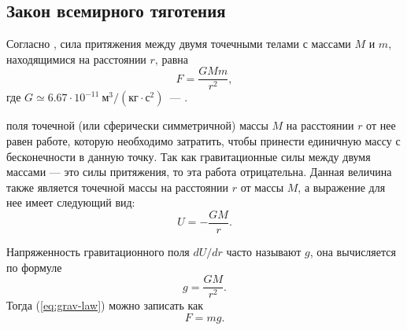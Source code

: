 \subsection{Закон всемирного тяготения}
Согласно , сила притяжения
между двумя точечными телами с массами $M$ и $m$,
находящимися на расстоянии $r$, равна
\begin{equation}
	F=\frac{GMm}{r^2}, \label{eq:grav-law}
\end{equation}\nopagebreak где $G\simeq 6.67\cdot 10^{-11}~\text{м}^3 /
\left( \text{кг} \cdot \text{с}^2 \right)$~---
.

 поля точечной (или сферически
симметричной) массы $M$ на расстоянии $r$ от нее равен
работе, которую необходимо затратить, чтобы принести
единичную массу с бесконечности в данную точку. Так как
гравитационные силы между двумя массами --- это силы
притяжения, то эта работа отрицательна. Данная
величина также является  точечной
массы на расстоянии $r$ от массы $M$, а выражение для нее имеет
следующий вид:
\begin{equation}
	U=-\frac{GM}{r}.
\end{equation}

Напряженность гравитационного поля $dU/dr$ часто называют
 $g$, она вычисляется по формуле
\begin{equation}
	g = \frac{GM}{r^2}.
	\label{eq:g}
\end{equation}
Тогда (\ref{eq:grav-law}) можно записать как
\begin{equation}
	F = mg.
\end{equation}
